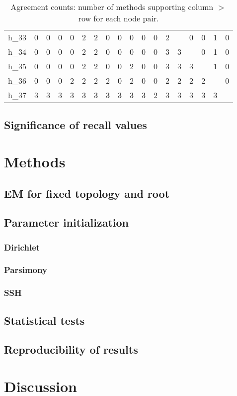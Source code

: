 \documentclass[]{article}
\begin{document}
\begin{table}[htbp]
\begin{tabular}{l*{17}{c}}
					h\_33 & 0 & 0 & 0 & 0 & 2 & 2 & 0 & 0 & 0 & 0 & 0 & 2 & \textemdash & 0 & 0 & 1 & 0 \\
					h\_34 & 0 & 0 & 0 & 0 & 2 & 2 & 0 & 0 & 0 & 0 & 0 & 3 & 3 & \textemdash & 0 & 1 & 0 \\
					h\_35 & 0 & 0 & 0 & 0 & 2 & 2 & 0 & 0 & 2 & 0 & 0 & 3 & 3 & 3 & \textemdash & 1 & 0 \\
					h\_36 & 0 & 0 & 0 & 2 & 2 & 2 & 2 & 0 & 2 & 0 & 0 & 2 & 2 & 2 & 2 & \textemdash & 0 \\
					h\_37 & 3 & 3 & 3 & 3 & 3 & 3 & 3 & 3 & 3 & 3 & 2 & 3 & 3 & 3 & 3 & 3 & \textemdash \\
					\bottomrule
				\end{tabular}
				\caption{Agreement counts: number of methods supporting column $>$ row for each node pair.}
				\label{tab:wmw_agreement}
			\end{table}
			
		\subsection{Significance of recall values}
		
	\section{Methods}		
		\subsection{EM for fixed topology and root}
		\subsection{Parameter initialization}
		\subsubsection{Dirichlet}
		\subsubsection{Parsimony}
		\subsubsection{SSH}
		\subsection{Statistical tests}
		\subsection{Reproducibility of results}
	\section{Discussion}	
	
\end{document}
